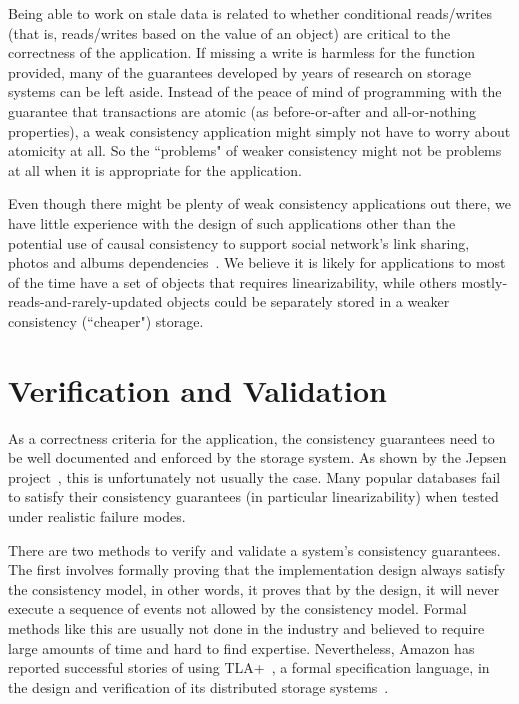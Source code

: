 \documentclass[12pt,conference]{IEEEtran}
\begin{document}
Being able to work on stale data is related to whether conditional reads/writes (that is, reads/writes based on the value of an object) are critical to the correctness of the application. If missing a write is harmless for the function provided, many of the guarantees developed by years of research on storage systems can be left aside. Instead of the peace of mind of programming with the guarantee that transactions are atomic (as before-or-after and all-or-nothing properties), a weak consistency application might simply not have to worry about atomicity at all. So the ``problems" of weaker consistency might not be problems at all when it is appropriate for the application.

Even though there might be plenty of weak consistency applications out there, we have little experience with the design of such applications other than the potential use of causal consistency to support social network's link sharing, photos and albums dependencies~\cite{lloyd2011don}. We believe it is likely for applications to most of the time have a set of objects that requires linearizability, while others mostly-reads-and-rarely-updated objects could be separately stored in a weaker consistency (``cheaper") storage.

\section{Verification and Validation}

As a correctness criteria for the application, the consistency guarantees need to be well documented and enforced by the storage system. As shown by the Jepsen project~\cite{jepsenWebsite,jepsenGithubWebsite}, this is unfortunately not usually the case. Many popular databases fail to satisfy their consistency guarantees (in particular linearizability) when tested under realistic failure modes.

There are two methods to verify and validate a system's consistency guarantees. The first involves formally proving that the implementation design always satisfy the consistency model, in other words, it proves that by the design, it will never execute a sequence of events not allowed by the consistency model. Formal methods like this are usually not done in the industry and believed to require large amounts of time and hard to find expertise. Nevertheless, Amazon has reported successful stories of using TLA+~\cite{tlaWebsite}, a formal specification language, in the design and verification of its distributed storage systems~\cite{newcombe2014use}.
\end{document}
